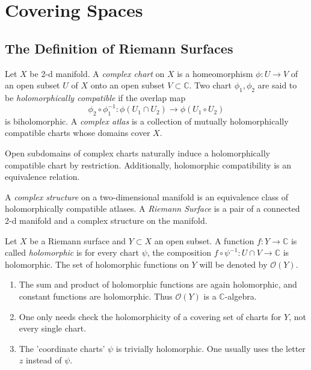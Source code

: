 \section{Covering Spaces}
\subsection{The Definition of Riemann Surfaces}

\begin{defn}

Let $X$ be 2-d manifold. A \textit{complex chart} on $X$ is a homeomorphism $\phi:U \to V$ of an open subset $U$ of $X$ onto an open subset $V \subset \mathbb{C}$. Two chart $\phi_1, \phi_2$ are said to be \textit{holomorphically compatible} if the overlap map 
\[
\phi_2 \circ \phi_1 ^{-1} : \phi(U_1 \cap U_2) \to \phi(U_1 \circ U_2)
\]
is biholomorphic. A \textit{complex atlas} is a collection of mutually holomorphically compatible charts whose domains cover $X$.
\end{defn}

\begin{rmk}

Open subdomains of complex charts naturally induce a  holomorphically compatible chart by restriction. Additionally, holomorphic compatibility is an equivalence relation.

\end{rmk}

\begin{defn}
A \textit{complex structure} on a two-dimensional manifold is an equivalence class of holomorphically compatible atlases. 
\smallskip
A \textit{Riemann Surface} is a pair of a connected 2-d manifold and a complex structure on the manifold.
\end{defn}

\begin{defn}

Let $X$ be a Riemann surface and $Y \subset X$ an open subset. A function $f: Y \to \mathbb{C}$ is called \textit{holomorphic} is for every chart $\psi$, the composition $f \circ \psi^{-1}: U \cap V \to \mathbb{C}$ is holomorphic. The set of holomorphic functions on $Y$ will be denoted by $\mathcal{O}(Y)$.

\end{defn}

\begin{rmk}

\begin{enumerate}
    \item The sum and product of holomorphic functions are again holomorphic, and constant functions are holomorphic. Thus $\mathcal{O}(Y)$ is a $\mathbb{C}$-algebra.
    \item One only needs check the holomorphicity of a covering set of charts for $Y$, not every single chart.
    \item The 'coordinate charts' $\psi$ is trivially holomorphic. One usually uses the letter $z$ instead of $\psi$.
\end{enumerate}

\end{rmk}

